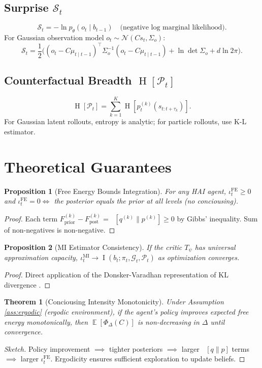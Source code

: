 \documentclass[11pt,a4paper]{article}
\DeclareMathOperator{\KL}{D_{\mathrm{KL}}}
\DeclareMathOperator{\MI}{I}
\DeclareMathOperator{\Ent}{H}
\DeclareMathOperator{\E}{\mathbb{E}}
\newcommand{\Gvec}{\mathcal{G}}
\newcommand{\Pvec}{\mathcal{P}}
\newcommand{\given}{\mid}
\newcommand{\trans}{^\top}
\newtheorem{proposition}{Proposition}
\newtheorem{theorem}{Theorem}
\begin{document}
\subsection{Surprise $\mathcal{S}_t$}
\[
\mathcal{S}_t = -\ln p_\theta(o_t \given b_{t-1}) \quad \text{(negative log marginal likelihood)}.
\]
For Gaussian observation model $o_t \sim \mathcal{N}(C s_t, \Sigma_o)$:
\[
\mathcal{S}_t = \frac12 \bigl( (o_t - C\mu_{t\given t-1})\trans \Sigma_o^{-1} (o_t - C\mu_{t\given t-1}) + \ln\det\Sigma_o + d\ln 2\pi \bigr).
\]

\subsection{Counterfactual Breadth $\Ent[\Pvec_t]$}
\[
\Ent[\Pvec_t] = \sum_{k=1}^K \Ent[ p^{(k)}_t(s_{t:t+\tau_k}) ].
\]
For Gaussian latent rollouts, entropy is analytic; for particle rollouts, use K-L estimator.

\section{Theoretical Guarantees}
\label{sec:theory}

\begin{proposition}[Free Energy Bounds Integration]
\label{prop:FE_bound}
For any HAI agent, $\iota_t^{\mathrm{FE}} \ge 0$ and $\iota_t^{\mathrm{FE}} = 0 \iff$ the posterior equals the prior at all levels (no conciousing).
\end{proposition}
\begin{proof}
Each term $F^{(k)}_{\mathrm{prior}} - F^{(k)}_{\mathrm{post}} = \KL[q^{(k)} \parallel p^{(k)}] \ge 0$ by Gibbs' inequality. Sum of non-negatives is non-negative.
\end{proof}

\begin{proposition}[MI Estimator Consistency]
\label{prop:MI_consistency}
If the critic $T_\psi$ has universal approximation capacity, $\iota_t^{\mathrm{MI}} \to \MI(b_t; \pi_t, \Gvec_t, \Pvec_t)$ as optimization converges.
\end{proposition}
\begin{proof}
Direct application of the Donsker-Varadhan representation of KL divergence \cite{donsker1983asymptotic}.
\end{proof}

\begin{theorem}[Conciousing Intensity Monotonicity]
\label{thm:monotonicity}
Under Assumption \ref{ass:ergodic} (ergodic environment), if the agent's policy improves expected free energy monotonically, then $\E[\Phi_\Delta(C)]$ is non-decreasing in $\Delta$ until convergence.
\end{theorem}
\begin{proof}[Sketch]
Policy improvement $\implies$ tighter posteriors $\implies$ larger $\KL[q\parallel p]$ terms $\implies$ larger $\iota_t^{\mathrm{FE}}$. Ergodicity ensures sufficient exploration to update beliefs.
\end{proof}
\end{document}
